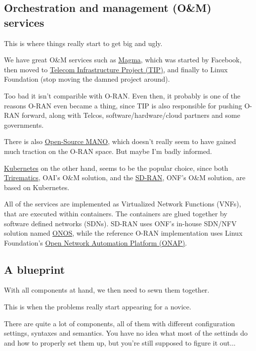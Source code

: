 \documentclass{article}
\begin{document}
    \subsection{Orchestration and management (O\&M) services}
        This is where things really start to get big and ugly.

        We have great O\&M services such as \href{https://magmacore.org/}{Magma},
        which was started by Facebook, then moved to
        \href{https://telecominfraproject.com/}{Telecom Infrastructure Project (TIP)},
        and finally to Linux Foundation (stop moving the damned project around).

        Too bad it isn't comparible with O-RAN. Even then, it probably is one of the
        reasons O-RAN even became a thing, since TIP is also responsible for pushing
        O-RAN forward, along with Telcos, software/hardware/cloud partners and some governments.

        There is also \href{https://osm.etsi.org/}{Open-Source MANO}, which doesn't
        really seem to have gained much traction on the O-RAN space. But maybe I'm badly informed.

        \href{https://kubernetes.io/}{Kubernetes} on the other hand, seems to be the
        popular choice, since both \href{https://openairinterface.org/mosaic5g/}{Trirematics},
        OAI's O\&M solution, and the \href{https://opennetworking.org/open-ran/}{SD-RAN},
        ONF's O\&M solution, are based on Kubernetes.

        All of the services are implemented as Virtualized Network Functions (VNFs),
        that are executed within containers. The containers are glued together by
        software defined networks (SDNs). SD-RAN uses ONF's in-house SDN/NFV solution
        named \href{https://opennetworking.org/onos/}{ONOS}, while the reference
        O-RAN implementation uses Linux Foundation's
        \href{https://www.onap.org/}{Open Network Automation Platform (ONAP)}.

    \subsection{A blueprint}
        With all components at hand, we then need to sewn them together.

        This is when the problems really start appearing for a novice.

        There are quite a lot of components, all of them with different
        configuration settings, syntaxes and semantics. You have no idea
        what most of the settinds do and how to properly set them up, but
        you're still supposed to figure it out...
\end{document}
